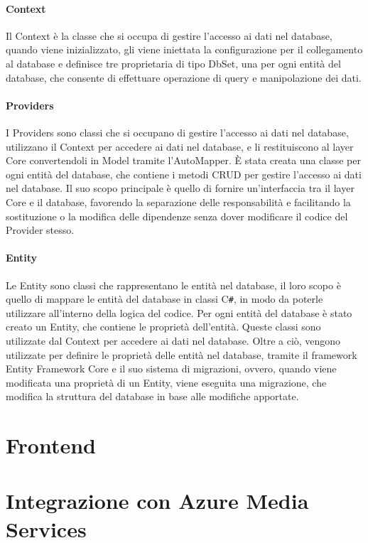 \paragraph{Context}
Il Context è la classe che si occupa di gestire l'accesso ai dati nel database, quando viene inizializzato, gli viene iniettata la configurazione per il collegamento al database e definisce tre proprietaria di tipo DbSet, una per ogni entità del database, che consente di effettuare operazione di query e manipolazione dei dati.\\

\paragraph{Providers}
I Providers sono classi che si occupano di gestire l'accesso ai dati nel database, utilizzano il Context per accedere ai dati nel database, e li restituiscono al layer Core convertendoli in Model tramite l'AutoMapper. È stata creata una classe per ogni entità del database, che contiene i metodi CRUD per gestire l'accesso ai dati nel database. Il suo scopo principale è quello di fornire un'interfaccia tra il layer Core e il database, favorendo la separazione delle responsabilità e facilitando la sostituzione o la modifica delle dipendenze senza dover modificare il codice del Provider stesso.\\

\paragraph{Entity}
Le Entity sono classi che rappresentano le entità nel database, il loro scopo è quello di mappare le entità del database in classi C\texttt{\#}, in modo da poterle utilizzare all'interno della logica del codice. Per ogni entità del database è stato creato un Entity, che contiene le proprietà dell'entità. Queste classi sono utilizzate dal Context per accedere ai dati nel database. Oltre a ciò, vengono utilizzate per definire le proprietà delle entità nel database, tramite il framework Entity Framework Core e il suo sistema di migrazioni, ovvero, quando viene modificata una proprietà di un Entity, viene eseguita una migrazione, che modifica la struttura del database in base alle modifiche apportate.\\

\section{Frontend}


\section{Integrazione con Azure Media Services}